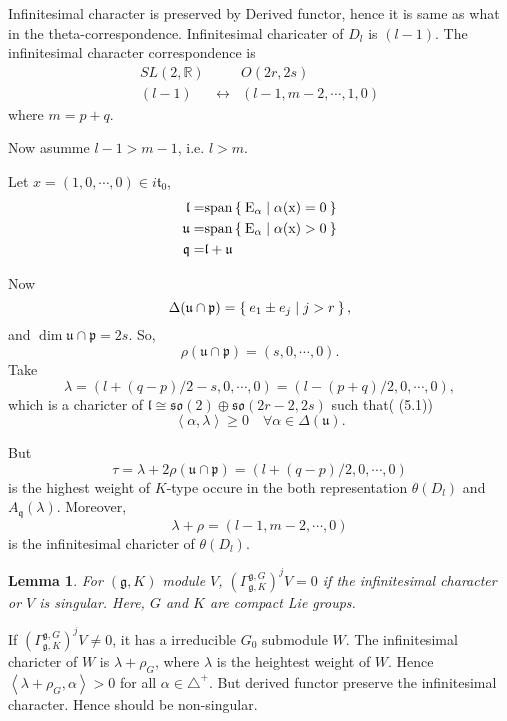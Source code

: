 \documentclass[12pt]{article}
\newtheorem{lemma}{Lemma}
\def\bR{{\mathbb{R}}}
\def\sspan{\rm{span}}
\def\inn#1#2{\left\langle{#1},{#2}\right\rangle}
\def\aso{\mathfrak{so}}
\def\fuu{\mathfrak{u}}
\def\fll{\mathfrak{l}}
\def\fpp{\mathfrak{p}}
\def\fqq{\mathfrak{q}}
\def\ftt{\mathfrak{t}}
\def\fgg{\mathfrak{g}}
\begin{document}
Infinitesimal character is preserved by Derived functor, hence it is same as 
what in the theta-correspondence.
Infinitesimal charicater of $D_l$ is $(l-1)$. 
The infinitesimal character correspondence is 
\[
\begin{matrix}
 SL(2,\bR) & & O(2r,2s)\\
 (l-1) & \leftrightarrow & (l-1, m-2, \cdots, 1, 0)
\end{matrix}
\]
where $m=p+q$.

Now asumme $l-1>m-1$, i.e. $l>m$.

Let $x = (1, 0,\cdots, 0)\in i\ftt_0$,
\begin{align*}
\fll =& \sspan \Set{E_\alpha |\alpha(x) =0 }\\
\fuu =& \sspan \Set{E_\alpha |\alpha(x) >0 }\\
\fqq =& \fll+\fuu
\end{align*}

Now 
\[
\Delta(\fuu\cap \fpp) = \Set{e_1\pm e_j|j>r},
\]
and $\dim \fuu\cap \fpp = 2s$.
So, 
\[
\rho(\fuu\cap \fpp) = (s, 0, \cdots, 0).
\]
Take
\[
\lambda = (l+(q-p)/2-s, 0, \cdots, 0)=(l-(p+q)/2,0,\cdots, 0),
\]
which is a charicter of $\fll\cong \aso(2)\oplus \aso(2r-2,2s)$ 
such that(\cite{VoganZuckerman1984} (5.1))
\[
\inn{\alpha}{\lambda} \geq 0 \quad \forall \alpha \in \Delta(\fuu).
\]

But
\[
\tau = \lambda+2\rho(\fuu\cap\fpp) = (l+(q-p)/2, 0,\cdots, 0)
\]
is the highest weight of $K$-type occure in the both representation 
$\theta(D_l)$ and $A_\fqq(\lambda)$.
Moreover,
\[
\lambda + \rho = (l-1, m-2, \cdots, 0)
\]
is the infinitesimal charicter of $\theta(D_l)$. 

\begin{lemma}
For $(\fgg,K)$ module $V$, $\left(\Gamma_{\fgg,K}^{\fgg,G}\right)^j V = 0$ if the infinitesimal
character or $V$ is singular. Here, $G$ and $K$ are compact Lie groups.
\end{lemma}
\proof
If $(\Gamma_{\fgg,K}^{\fgg,G})^j V\neq 0$, it has a irreducible $G_0$ submodule $W$. 
The infinitesimal charicter of $W$ is $\lambda + \rho_G$, where $\lambda$ 
is the heightest weight of $W$. Hence $\inn{\lambda+\rho_G}{\alpha}>0$ for all
$\alpha\in \triangle^+$. But derived functor preserve 
the infinitesimal character. Hence should be non-singular.
\end{document}
